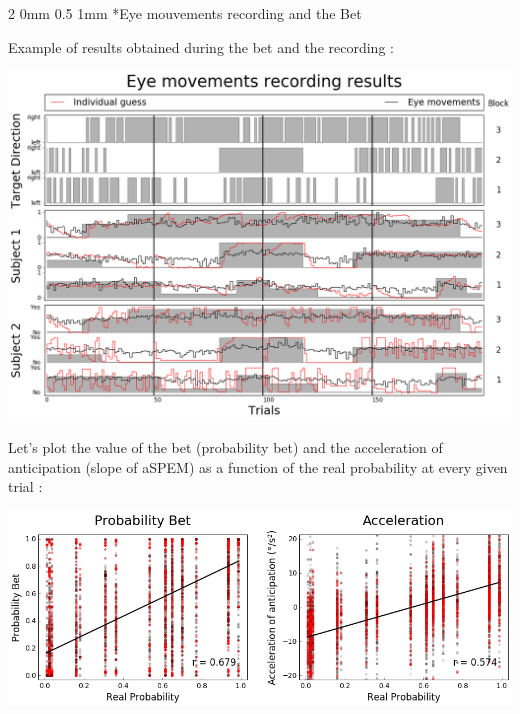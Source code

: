 \documentclass[profile,final,english, draft]{sciposter}%
\makeatletter
\renewcommand{\subsection}{\@startsection
        {subsection}%
        {2}%
        {0mm}%
        {0.5\baselineskip}%
        {1mm}%
        {\normalsize\color[rgb]{0.4,0,0}\bfseries}}%
\makeatother
\begin{document}
\begin{multicols}{3}
\subsection*{Eye mouvements recording and the Bet}

Example of results obtained during the bet and the recording :

\begin{center}
    \includegraphics[width=1\columnwidth]{results_enregistrement}
\end{center}



Let's plot the value of the bet (probability bet)  and the acceleration of anticipation (slope of aSPEM) as a function of the real probability at every given trial :

\begin{center} 
    \includegraphics[width=1\columnwidth]{P_real}
\end{center}


\end{multicols}
\end{document}
